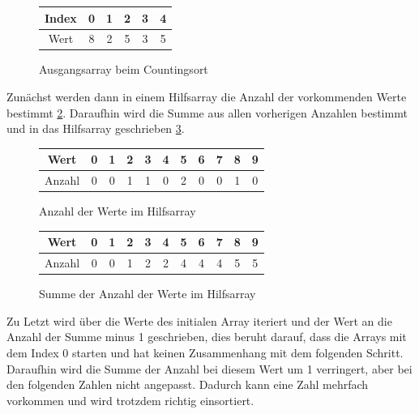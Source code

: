 \documentclass[intern,palatino]{cgBA}
\begin{document}
\begin{figure}[H]
	\centering
	\begin{tabular}{ | c || c | c | c | c | c |}
		\hline
		Index 				&  0 & 1 & 2 & 3 & 4 \\ \hline
		Wert				&  8 & 2 & 5 & 3 & 5 \\
		\hline
	\end{tabular}
	\caption{Ausgangsarray beim Countingsort}
	\label{tab:Counting1}
\end{figure}

Zunächst werden dann in einem Hilfsarray die Anzahl der vorkommenden Werte bestimmt \ref{tab:Counting2}. Daraufhin wird die Summe aus allen vorherigen Anzahlen bestimmt und in das Hilfsarray geschrieben \ref{tab:Counting3}.
\newline

\begin{figure}[H]
	\centering
	\begin{tabular}{ | c || c | c | c | c | c | c | c | c | c | c |}
		\hline
		Wert 				& 0	&  1 & 2 & 3 & 4 & 5 & 6 & 7 & 8 & 9	\\ \hline
		Anzahl				& 0 &  0 & 1 & 1 & 0 & 2 & 0 & 0 & 1 & 0	\\
		\hline
	\end{tabular}
	\caption{Anzahl der Werte im Hilfsarray}
	\label{tab:Counting2}
\end{figure}

\begin{figure}[H]
	\centering
	\begin{tabular}{ | c || c | c | c | c | c | c | c | c | c | c |}
		\hline
		Wert 				& 0	&  1 & 2 & 3 & 4 & 5 & 6 & 7 & 8 & 9	\\ \hline
		Anzahl				& 0 &  0 & 1 & 2 & 2 & 4 & 4 & 4 & 5 & 5	\\
		\hline
	\end{tabular}
	\caption{Summe der Anzahl der Werte im Hilfsarray}
	\label{tab:Counting3}
\end{figure}

Zu Letzt wird über die Werte des initialen Array iteriert und der Wert an die Anzahl der Summe minus 1 geschrieben, dies beruht darauf, dass die Arrays mit dem Index 0 starten und hat keinen Zusammenhang mit dem folgenden Schritt. Daraufhin wird die Summe der Anzahl bei diesem Wert um 1 verringert, aber bei den folgenden Zahlen nicht angepasst. Dadurch kann eine Zahl mehrfach vorkommen und wird trotzdem richtig einsortiert.
\newline
\end{document}
